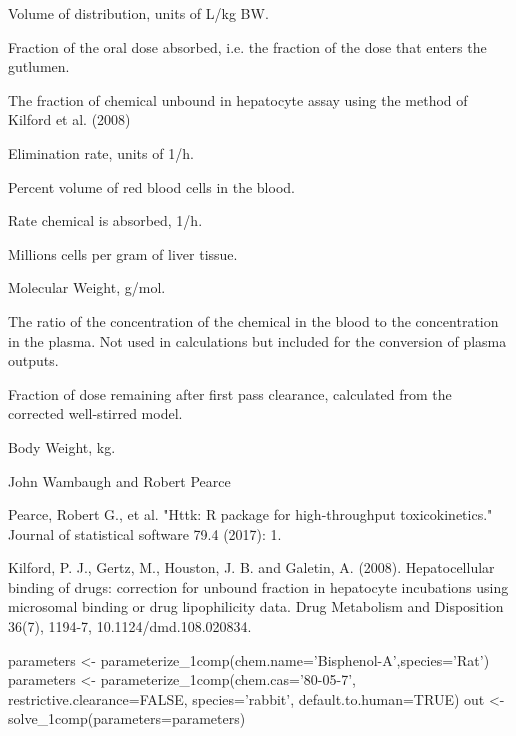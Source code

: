 \documentclass[a4paper]{book}
\begin{document}
%
\begin{Value}
\begin{ldescription}
\item[\code{Vdist}] Volume of distribution, units of L/kg BW.
\item[\code{Fgutabs}] Fraction of the oral dose absorbed, i.e. the fraction of the
dose that enters the gutlumen.
\item[\code{Fhep.assay.correction}] The fraction of chemical unbound in hepatocyte 
assay using the method of Kilford et al. (2008)
\item[\code{kelim}] Elimination rate, units of 1/h.
\item[\code{hematocrit}] Percent volume of red blood cells in the blood.
\item[\code{kgutabs}] Rate chemical is absorbed, 1/h.
\item[\code{million.cells.per.gliver}] Millions cells per gram of liver tissue.
\item[\code{MW}] Molecular Weight, g/mol.
\item[\code{Rblood2plasma}] The ratio of the concentration of the chemical in the 
blood to the concentration in the plasma. Not used in calculations but 
included for the conversion of plasma outputs.
\item[\code{hepatic.bioavailability}] Fraction of dose remaining after
first pass clearance, calculated from the corrected well-stirred model.
\item[\code{BW}] Body Weight, kg.
\end{ldescription}
\end{Value}
%
\begin{Author}\relax
John Wambaugh and Robert Pearce
\end{Author}
%
\begin{References}\relax
Pearce, Robert G., et al. "Httk: R package for high-throughput 
toxicokinetics." Journal of statistical software 79.4 (2017): 1.

Kilford, P. J., Gertz, M., Houston, J. B. and Galetin, A.
(2008). Hepatocellular binding of drugs: correction for unbound fraction in
hepatocyte incubations using microsomal binding or drug lipophilicity data.
Drug Metabolism and Disposition 36(7), 1194-7, 10.1124/dmd.108.020834.
\end{References}
%
\begin{Examples}
\begin{ExampleCode}

 parameters <- parameterize_1comp(chem.name='Bisphenol-A',species='Rat')
 parameters <- parameterize_1comp(chem.cas='80-05-7',
                                  restrictive.clearance=FALSE,
                                  species='rabbit',
                                  default.to.human=TRUE)
 out <- solve_1comp(parameters=parameters)

\end{ExampleCode}
\end{Examples}
\end{document}
